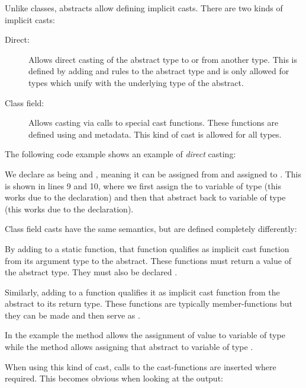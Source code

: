 {Unlike classes, abstracts allow defining implicit casts. There are two kinds of implicit casts:

\begin{description}
	\item[Direct:] Allows direct casting of the abstract type to or from another type. This is defined by adding  and  rules to the abstract type and is only allowed for types which unify with the underlying type of the abstract.
	\item[Class field:] Allows casting via calls to special cast functions. These functions are defined using  and  metadata. This kind of cast is allowed for all types.
\end{description}
The following code example shows an example of \emph{direct} casting:

We declare  as being  and , meaning it can be assigned from  and assigned to . This is shown in lines 9 and 10, where we first assign the   to variable  of type  (this works due to the  declaration) and then that abstract back to variable  of type  (this works due to the  declaration).

Class field casts have the same semantics, but are defined completely differently:

By adding  to a static function, that function qualifies as implicit cast function from its argument type to the abstract. These functions must return a value of the abstract type. They must also be declared .

Similarly, adding  to a function qualifies it as implicit cast function from the abstract to its return type. These functions are typically member-functions but they can be made  and then serve as .

In the example the method  allows the assignment of value  to variable  of type  while the method  allows assigning that abstract to variable  of type .

When using this kind of cast, calls to the cast-functions are inserted where required. This becomes obvious when looking at the  output:

}
